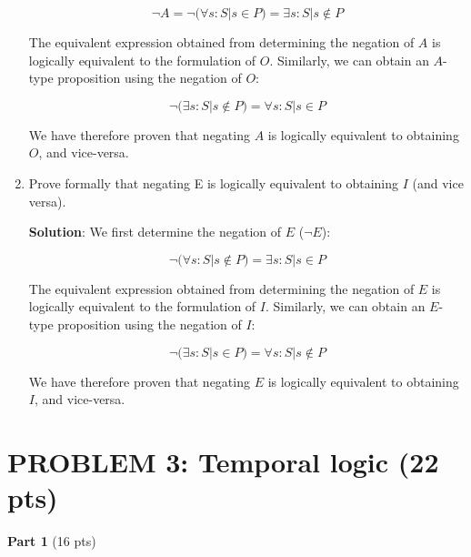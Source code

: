 \documentclass[12pt]{article}
\begin{document}
\begin{spacing}{1.5}
\begin{enumerate}
		      $$\neg A = \neg (\forall s : S | s \in P ) = \exists s : S | s \notin P$$
		      		      		      		      		      		      		      
		      The equivalent expression obtained from determining the negation of $A$ is logically equivalent to the formulation of $O$. Similarly, we can obtain an $A$-type proposition using the negation of $O$:
		      		      		      		      		      		      		      
		      $$\neg (\exists s : S | s \notin P) = \forall s : S | s \in P$$
		      		      		      		      		      		      		      
		      We have therefore proven that negating $A$ is logically equivalent to obtaining $O$, and vice-versa.
		      		      		      		      		      		      		              
		\item Prove formally that negating E is logically equivalent to obtaining $I$ (and vice versa).
		      		      		      		      		      		      		      
		      \textbf{Solution}: We first determine the negation of $E$ ($\neg E$):
		      		      		      		      		      		      		      
		      $$\neg (\forall s : S | s \notin P)=\exists s : S | s \in P$$
		      		      		      		      		      		      		      
		      The equivalent expression obtained from determining the negation of $E$ is logically equivalent to the formulation of $I$. Similarly, we can obtain an $E$-type proposition using the negation of $I$:
		      		      		      		      		      		      		      
		      $$\neg (\exists s : S | s \in P) = \forall s : S | s \notin P$$
		      		      		      		      		      		      		      
		      We have therefore proven that negating $E$ is logically equivalent to obtaining $I$, and vice-versa.
		      		      		      		      		      		      		      
	\end{enumerate}
								    
							    
	\newpage
							    
	\section*{PROBLEM 3: Temporal logic (22 pts)}
							
	\textbf{Part 1} (16 pts)\\
							    

\end{spacing}
\end{document}
